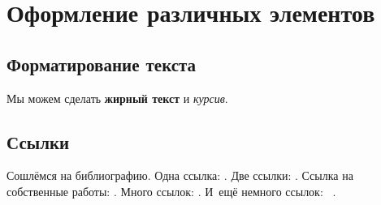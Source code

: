 \chapter{Оформление различных элементов}\label{ch:ch1}

\section{Форматирование текста}\label{sec:ch1/sec1}

Мы можем сделать \textbf{жирный текст} и \textit{курсив}.

\section{Ссылки}\label{sec:ch1/sec2}

Сошлёмся на библиографию.
Одна ссылка: \cite[с.~54]{Sokolov}\cite[с.~36]{Gaidaenko}.
Две ссылки: \cite{Sokolov,Gaidaenko}.
Ссылка на собственные работы: \cite{vakbib1, confbib2}.
Много ссылок: %
\cite{Lermontov, Management, Borozda, Marketing, Constitution, FamilyCode,
    Gost.7.0.53, Razumovski, Lagkueva, Pokrovski, Methodology, Berestova,
    Kriger}%
%
.
И~ещё немного ссылок:~\cite{Article,Book,Booklet,Conference,Inbook,Incollection,Manual,Mastersthesis,
    Misc,Phdthesis,Proceedings,Techreport,Unpublished}
\cite{medvedev2006jelektronnye, CEAT:CEAT581, doi:10.1080/01932691.2010.513279,
    Gosele1999161,Li2007StressAnalysis, Shoji199895, test:eisner-sample,
    test:eisner-sample-shorted, AB_patent_Pomerantz_1968, iofis_patent1960}%
%
.

%


